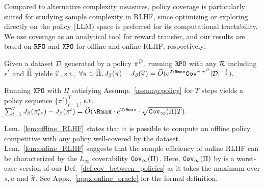 %
Compared to alternative complexity measures, policy coverage is particularly suited for studying sample complexity in RLHF, since optimizing or exploring directly on the policy (LLM) space is preferred for its computational tractability.
%
%
We use coverage as an analytical tool for reward transfer, and our results are based on ${\texttt{RPO}}$ \citep{liu2024provably} and ${\texttt{XPO}}$ \citep{xie2024exploratory} for offline and online RLHF, respectively:
\begin{lemma}\label{lem:offline_RLHF}
    Given a dataset $\mathcal{D}$ generated by a policy $\pi^{\mathcal{D}}$, running ${\texttt{RPO}}$ with any $\mathcal{R}$ including $r^*$ and $\widetilde{\Pi}$ yields $\widehat{\pi}$, s.t.,
    $
        \forall \pi\in\tPi,J_\beta(\pi) - J_\beta(\hpi) = \tilde{O}( e^{2{\Rmax}} \cov^{\pi|\pi^\cD} |\cD|^{-\frac{1}{2}}).
    $
\end{lemma}
\begin{lemma}\label{lem:online_RLHF}
    Running ${\texttt{XPO}}$ with $\Pi$ satisfying Assump.~\ref{assump:policy} for $T$ steps yields a policy sequence $\{\pi^t\}_{t=1}^T$, s.t.
    $
        \sum_{t=1}^T J_\beta(\pi^*_{r^*}) - J_\beta(\pi^t) = \tilde{O}({\Rmax}\cdot e^{2{\Rmax}} \cdot\sqrt{\cov_\infty(\Pi) T}).
    $
\end{lemma}
Lem.~\ref{lem:offline_RLHF} states that it is possible to compute an offline policy competitive with any policy well-covered by the dataset.
%
Lem.~\ref{lem:online_RLHF} suggests that the sample efficiency of online RLHF can be characterized by the $L_\infty$ coverability ${\texttt{Cov}}_\infty(\Pi)$.
Here, ${\texttt{Cov}}_\infty(\Pi)$ by \citet{xie2022role} is a worst-case version of our Def.~\ref{def:cov_between_policies} as it takes the maximum over $s, a$ and $\widetilde{\pi}$. See Appx.~\ref{appx:online_oracle} for the formal definition.
